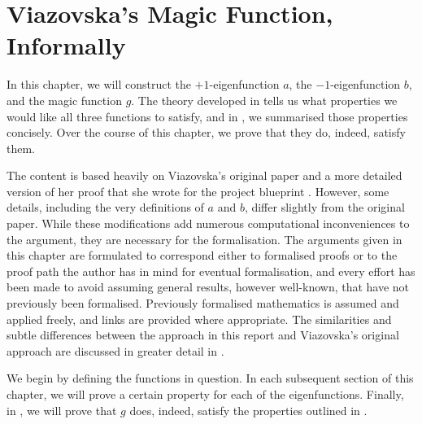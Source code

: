 \chapter{Viazovska's Magic Function, Informally}
\label{Ch4:Chapter}
\thispagestyle{empty}

In this chapter, we will construct the $+1$-eigenfunction $a$, the $-1$-eigenfunction $b$, and the magic function $g$. The theory developed in  tells us what properties we would like all three functions to satisfy, and in , we summarised those properties concisely. Over the course of this chapter, we prove that they do, indeed, satisfy them.

The content is based heavily on Viazovska's original paper \cite{Viazovska8} and a more detailed version of her proof that she wrote for the project blueprint \cite{blueprint}. However, some details, including the very definitions of $a$ and $b$, differ slightly from the original paper. While these modifications add numerous computational inconveniences to the argument, they are necessary for the formalisation. The arguments given in this chapter are formulated to correspond either to formalised proofs or to the proof path the author has in mind for eventual formalisation, and every effort has been made to avoid assuming general results, however well-known, that have not previously been formalised. Previously formalised mathematics is assumed and applied freely, and links are provided where appropriate. The similarities and subtle differences between the approach in this report and Viazovska's original approach are discussed in greater detail in .

We begin by defining the functions in question. In each subsequent section of this chapter, we will prove a certain property for each of the eigenfunctions. Finally, in , we will prove that $g$ does, indeed, satisfy the properties outlined in .






